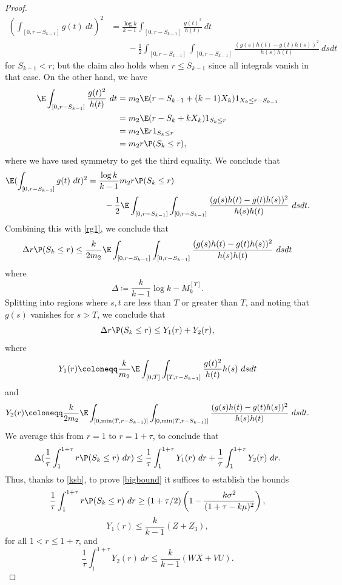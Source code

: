 \begin{proof}
\[\begin{split} \left(\int_{[0,r-S_{k-1}]} g(t)\ dt\right)^2 &= \frac{\log k}{k-1} \int_{[0,r-S_{k-1}]} \frac{g(t)^2}{h(t)}\ dt \\
&\qquad- \frac{1}{2} \int_{[0,r-S_{k-1}]} \int_{[0,r-S_{k-1}]} \frac{(g(s)h(t)-g(t)h(s))^2}{h(s)h(t)}\ ds dt\end{split}\]
for $S_{k-1} < r$; but the claim also holds when $r \leq S_{k-1}$ since all integrals vanish in that case.  On the other hand, we have
\begin{align*}
\E \int_{[0,r-S_{k-1}]} \frac{g(t)^2}{h(t)}\ dt &= m_2 \E (r - S_{k-1} + (k-1) X_k) 1_{X_k \leq r- S_{k-1}}\\
&= m_2 \E (r - S_k + k X_k) 1_{S_k \leq r} \\
&= m_2 \E r 1_{S_k \leq r} \\
&= m_2 r \P( S_k \leq r),
\end{align*}
where we have used symmetry to get the third equality.  We conclude that
\[\begin{split}
 \E (\int_{[0,r-S_{k-1}]} g(t)\ dt)^2 &= \frac{\log k}{k-1} m_2 r \P(S_k \leq r)\\
&\qquad - \frac{1}{2} \E \int_{[0,r-S_{k-1}]} \int_{[0,r-S_{k-1}]} \frac{(g(s)h(t)-g(t)h(s))^2}{h(s)h(t)}\ ds dt.
\end{split}\]
Combining this with \eqref{rg1}, we conclude that
$$
\Delta r \P( S_k \leq r) \leq \frac{k}{2m_2}
\E \int_{[0,r-S_{k-1}]} \int_{[0,r-S_{k-1}]} \frac{(g(s)h(t)-g(t)h(s))^2}{h(s)h(t)}\ ds dt
$$
where
$$ \Delta \coloneqq \frac{k}{k-1} \log k - M_k^{[T]}.$$
Splitting into regions where $s,t$ are less than $T$ or greater than $T$, and noting that $g(s)$ vanishes for $s > T$, we conclude that
$$
\Delta r \P( S_k \leq r) \leq Y_1(r) + Y_2(r), $$
where 
$$ Y_1(r) \coloneqq \frac{k}{m_2} \E \int_{[0,T]} \int_{[T,r-S_{k-1}]} \frac{g(t)^2}{h(t)} h(s)\ ds dt $$
and
$$ Y_2(r) \coloneqq \frac{k}{2m_2} \E \int_{[0,\min(T,r-S_{k-1})]} \int_{[0,\min(T,r-S_{k-1})]} \frac{(g(s)h(t)-g(t)h(s))^2}{h(s)h(t)}\ ds dt.$$
We average this from $r=1$ to $r=1+\tau$, to conclude that
$$
\Delta (\frac{1}{\tau} \int_1^{1+\tau} r \P( S_k \leq r)\ dr) \leq \frac{1}{\tau} \int_1^{1+\tau} Y_1(r)\ dr + 
\frac{1}{\tau} \int_1^{1+\tau} Y_2(r)\ dr.$$
Thus, thanks to \eqref{ksb}, to prove \eqref{bigbound} it suffices to establish the bounds
\begin{equation}\label{denom-bound}
\frac{1}{\tau} \int_1^{1+\tau} r \P( S_k \leq r)\ dr \geq 
(1+\tau/2) \left(1 - \frac{k\sigma^2}{(1+\tau-k\mu)^2}\right),
\end{equation}
\begin{equation}\label{y1-bound}
Y_1(r) \leq \frac{k}{k-1}(Z + Z_3),
\end{equation}
for all $1 < r \leq 1+\tau$, and
\begin{equation}\label{y2-bound}
\frac{1}{\tau} \int_1^{1+\tau} Y_2(r)\ dr \leq \frac{k}{k-1}( WX+VU ).
\end{equation}


\end{proof}
